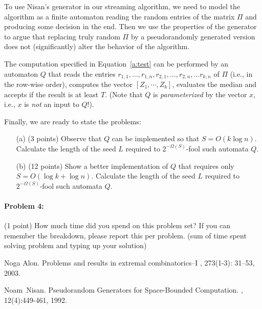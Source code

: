\documentclass[12pt]{article}
\begin{document}
To use Nisan's generator in our streaming algorithm, we need to model the algorithm as a finite automaton reading the random entries of the matrix $\Pi$ and producing some decision in the end. Then we use the properties of the generator to argue that replacing truly random $\Pi$ by a pseudorandomly generated version does not (significantly) alter the behavior of the algorithm. 

 The computation specified in Equation~\eqref{a:test} can be performed by an automaton $Q$ that reads the entries  $r_{1,1}, \ldots , r_{1,n}, r_{2,1}, \ldots , r_{2,n}, \ldots r_{k,n}$ of $\Pi$ (i.e., in the row-wise order), computes the vector $[ Z_1, \cdots , Z_k ]$, evaluates the median and accepts if the result is at least  $T$. (Note that $Q$ is {\em parameterized} by the vector $x$, i.e., $x$ is {\em not} an input to $Q$!).

Finally, we are ready to state the problems:

\begin{itemize}
\item[(a)] (3 points) Observe that $Q$ can be implemented so that $S=O( k \log n)$. Calculate the length of the seed $L$ required to $2^{-\Omega(S)}$-fool such automata $Q$.
\item [(b)] (12 points) Show a better implementation of $Q$ that requires only $S=O( \log k + \log n)$. Calculate the length of the seed $L$ required to $2^{-\Omega(S)}$-fool such automata $Q$.
\end{itemize}


\paragraph{Problem 4:} (1 point) How much time did you spend on this problem set? If you can remember the breakdown, please report this per problem. (sum of time spent solving problem and typing up your solution)



\begin{thebibliography}{42}

Noga Alon.
\newblock Problems and results in extremal combinatorics--I
, 273(1-3): 31--53, 2003.

Noam~Nisan.
\newblock Pseudorandom Generators for Space-Bounded Computation.
, 12(4):449-461, 1992.

\end{thebibliography}
\end{document}
